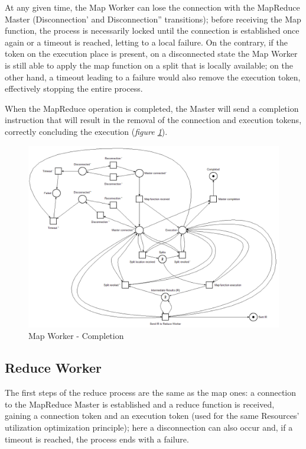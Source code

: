 \vspace{2mm}

At any given time, the Map Worker can lose the connection with the MapReduce Master (Disconnection' and Disconnection'' transitions); before receiving the Map function, the process is necessarily locked until the connection is established once again or a timeout is reached, letting to a local failure. On the contrary, if the token on the execution place is present, on a disconnected state the Map Worker is still able to apply the map function on a split that is locally available; on the other hand, a timeout leading to a failure would also remove the execution token, effectively stopping the entire process.
\vspace{8mm}

When the MapReduce operation is completed, the Master will send a completion instruction that will result in the removal of the connection and execution tokens, correctly concluding the execution (\textit{figure \ref{fig:map_worker_petri_net_4}}).

\begin{figure}[!ht]
    \centering
    \includegraphics[scale=0.45]{document/chapters/chapter_6/images/map_worker_petri_net_4.png}
    \caption{Map Worker - Completion}
    \label{fig:map_worker_petri_net_4}
\end{figure}

\subsection{Reduce Worker}
The first steps of the reduce process are the same as the map ones: a connection to the MapReduce Master is established and a reduce function is received, gaining a connection token and an execution token (used for the same Resources' utilization optimization principle); here a disconnection can also occur and, if a timeout is reached, the process ends with a failure.

